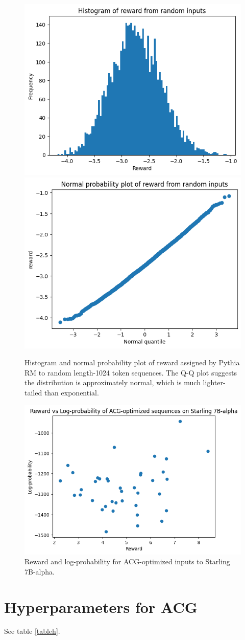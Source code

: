 \documentclass{article}
\begin{document}
\begin{figure}
    \centering
    \includegraphics[width=0.4\linewidth]{reward_hist_random_pythia.png}
    \includegraphics[width=0.4\linewidth]{reward_qq_random_pythia.png}
    \caption{Histogram and normal probability plot of reward assigned by Pythia RM to random length-1024 token sequences. The Q-Q plot suggests the distribution is approximately normal, which is much lighter-tailed than exponential.}
    \label{fig:pythia-random}
\end{figure}

\begin{figure}
    \centering
    \includegraphics[width=0.5\linewidth]{images/acg_results_40.png}
    \caption{Reward and log-probability for ACG-optimized inputs to Starling 7B-alpha.}
    \label{fig:acg-results}
\end{figure}

\section{Hyperparameters for ACG}

See table \ref{tableh}.
\end{document}
